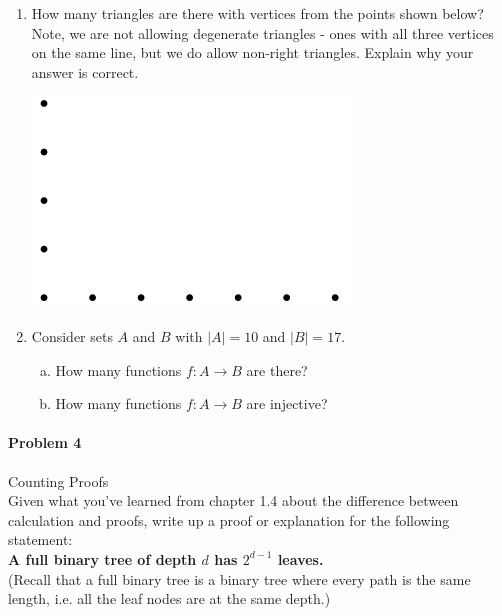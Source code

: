 \documentclass[11pt, a4paper]{article}
\newcommand\setItemNumber[1]{\setcounter{enumi}{\numexpr#1-1\relax}}
\begin{document}
\begin{enumerate}
\begin{enumerate}[(a)]
            \end{enumerate}

        \item How many triangles are there with vertices from the points shown below? Note, we are not allowing degenerate triangles - ones with all three vertices on the same line, but we do allow non-right triangles. Explain why your answer is correct.

            \begin{center}
            \includegraphics[width=.5\textwidth]{hw4_graphic2}
            \end{center}

        \setItemNumber{12}
        \item Consider sets $A$ and $B$ with $|A| = 10$ and $|B| = 17$.
            \begin{enumerate}[(a)]
                \item How many functions $f: A\rightarrow B$ are there?

                \item How many functions $f: A\rightarrow B$ are injective?

            \end{enumerate}

    \end{enumerate}


	
	\paragraph{Problem 4} Counting Proofs\\

	Given what you've learned from chapter 1.4 about the difference between calculation and proofs, write up a proof or explanation for the following statement:\\

	\textbf{A full binary tree of depth $d$ has $2^{d-1}$ leaves.} \\

	(Recall that a full binary tree is a binary tree where every path is the same length, i.e. all the leaf nodes are at the same depth.)
	
		
\end{document}
